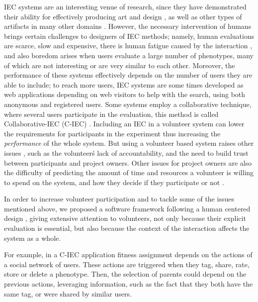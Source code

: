 IEC systems are an interesting venue of research, since they have demonstrated 
their ability for effectively 
producing art and design \cite{Bentley:1999:intro,Sims:1991,todd:1992,evoeco},
as well as other types of artifacts in many other domains \cite{ie1}. 
However, the necessary intervention of humans brings certain challenges 
to designers of IEC methods; namely, human evaluations are scarce, slow and expensive, there is
human fatigue caused by the interaction \cite{ie1}, and also boredom arises
when users evaluate a large number of phenotypes, 
many of which are not interesting or are very similar to each other.
Moreover, the performance of these systems effectively depends on the number of users
they are able to include; to reach more users,
IEC systems are some times developed as web applications depending on web visitors to help
with the search, using both anonymous and registered users. Some systems 
employ a collaborative technique, where several users participate in 
the evaluation, this method is called Collaborative-IEC (C-IEC)
\cite{picbreeder,seyama2016development,wagy2014collective}.
Including an IEC in a volunteer system can lower the requirements for
participants in the experiment thus increasing the {\em performance} of the whole system. But using a volunteer based 
system raises other issues \cite{sarmenta2001volunteer,web:BOINC}, such as the 
volunteer\'s lack of accountability, and the need to build trust between participants and project
owners. Other issues for project owners are also the difficulty of predicting 
the amount of time and resources a volunteer is willing to spend on the system, 
and how they decide if they participate or not \cite{JJ:2016}. 

In order to increase volunteer participation and to tackle some of the issues mentioned above,  
we proposed a software framework following a human centered design \cite{greenhouse2012human},
giving extensive attention to volunteers, not only because their
explicit evaluation is essential, but also because the context of the 
interaction affects the system as a whole.

For example, in a C-IEC application fitness assignment depends on the
actions of a social network of users.  These actions are triggered when 
they tag, share, rate, store or delete a phenotype. 
Then, the selection of parents could depend on the previous actions, leveraging information, 
such as the fact that they both have the same tag, or were shared by
similar users.

